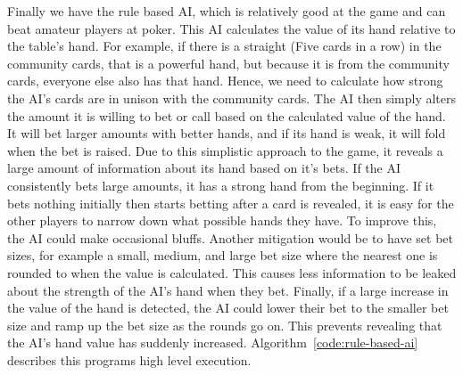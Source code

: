Finally we have the rule based AI, which is relatively good at the game and
can beat amateur players at poker. This AI calculates the value of its hand
relative to the table's hand. For example, if there is a straight (Five cards
in a row) in the community cards, that is a powerful hand, but because it
is from the community cards, everyone else also has that hand. Hence, we need
to calculate how strong the AI's cards are in unison with the community cards.
The AI then simply alters the amount it is willing to bet or call based on the
calculated value of the hand. It will bet larger amounts with better hands,
and if its hand is weak, it will fold when the bet is raised. Due to this
simplistic approach to the game, it reveals a large amount of information
about its hand based on it's bets. If the AI consistently bets large amounts,
it has a strong hand from the beginning. If it bets nothing initially then
starts betting after a card is revealed, it is easy for the other players to
narrow down what possible hands they have. To improve this, the AI could
make occasional bluffs. Another mitigation would be to have set bet sizes,
for example a small, medium, and large bet size where the nearest one is rounded
to when the value is calculated. This causes less information to be leaked
about the strength of the AI's hand when they bet. Finally, if a large increase
in the value of the hand is detected, the AI could lower their bet to the smaller
bet size and ramp up the bet size as the rounds go on. This prevents revealing
that the AI's hand value has suddenly increased.
Algorithm~\ref{code:rule-based-ai} describes this programs high level execution.

\vspace{0.3cm}


